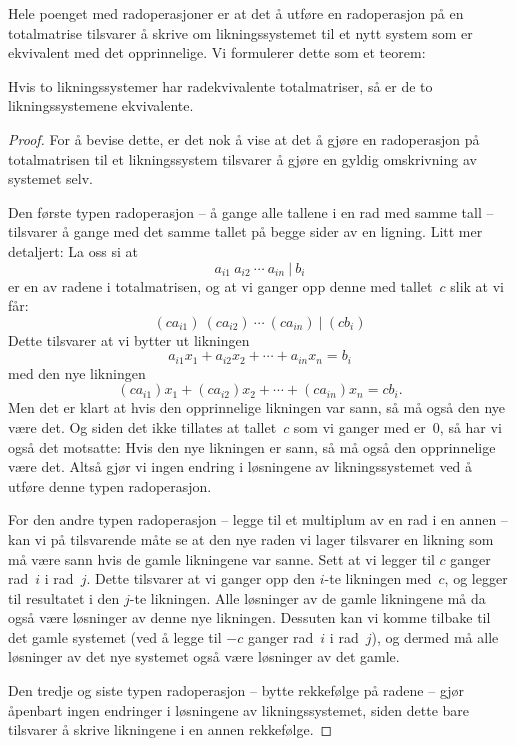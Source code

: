 Hele poenget med radoperasjoner er at det å utføre en radoperasjon på
en totalmatrise tilsvarer å skrive om likningssystemet til et nytt
system som er ekvivalent med det opprinnelige.  Vi formulerer dette
som et teorem:

\begin{thm}
\label{thm:radekvivalens}
Hvis to likningssystemer har radekvivalente totalmatriser, så er de to
likningssystemene ekvivalente.
\end{thm}
\begin{proof}
For å bevise dette, er det nok å vise at det å gjøre en radoperasjon
på totalmatrisen til et likningssystem tilsvarer å gjøre en gyldig
omskrivning av systemet selv.

Den første typen radoperasjon -- å gange alle tallene i en rad med
samme tall -- tilsvarer å gange med det samme tallet på begge sider av
en ligning.  Litt mer detaljert: La oss si at
\[
a_{i1}\ a_{i2}\ \cdots\ a_{in}\ |\ b_i
\]
er en av radene i totalmatrisen, og at vi ganger opp denne med
tallet~$c$ slik at vi får:
\[
(c a_{i1})\ (c a_{i2})\ \cdots\ (c a_{in})\ |\ (c b_i)
\]
Dette tilsvarer at vi bytter ut likningen
\[
a_{i1} x_1 + a_{i2} x_2 + \cdots + a_{in} x_n = b_i
\]
med den nye likningen
\[
(c a_{i1}) x_1 + (c a_{i2}) x_2 + \cdots + (c a_{in}) x_n = c b_i.
\]
Men det er klart at hvis den opprinnelige likningen var sann, så må
også den nye være det.  Og siden det ikke tillates at tallet~$c$ som
vi ganger med er~$0$, så har vi også det motsatte: Hvis den nye
likningen er sann, så må også den opprinnelige være det.  Altså gjør
vi ingen endring i løsningene av likningssystemet ved å utføre denne
typen radoperasjon.

For den andre typen radoperasjon -- legge til et multiplum av en rad i
en annen -- kan vi på tilsvarende måte se at den nye raden vi lager
tilsvarer en likning som må være sann hvis de gamle likningene var
sanne.  Sett at vi legger til $c$ ganger rad~$i$ i rad~$j$.  Dette
tilsvarer at vi ganger opp den $i$-te likningen med~$c$, og legger til
resultatet i den $j$-te likningen.  Alle løsninger av de gamle
likningene må da også være løsninger av denne nye likningen.  Dessuten
kan vi komme tilbake til det gamle systemet (ved å legge til $-c$
ganger rad~$i$ i rad~$j$), og dermed må alle løsninger av det nye
systemet også være løsninger av det gamle.

Den tredje og siste typen radoperasjon -- bytte rekkefølge på radene
-- gjør åpenbart ingen endringer i løsningene av likningssystemet,
siden dette bare tilsvarer å skrive likningene i en annen rekkefølge.
\end{proof}


